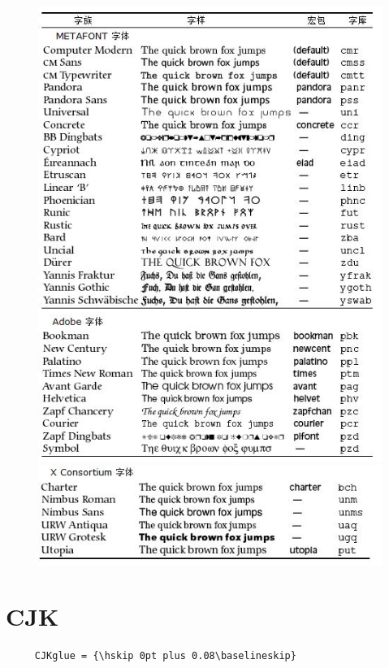 \documentclass[12pt]{book}
\begin{document}
\begin{figure}[htbp]
    \centering
    \includegraphics[scale=0.8]{font-1.jpg}
    \includegraphics[scale=0.7]{font-2.jpg}
\end{figure}


\section{CJK}


\begin{verbatim}
     CJKglue = {\hskip 0pt plus 0.08\baselineskip}
\end{verbatim}
\end{document}
